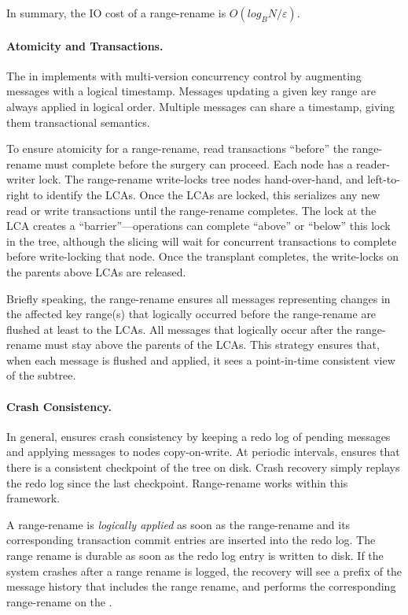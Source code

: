 In summary, the IO cost of a range-rename is $O(log_{B}{N}/\varepsilon)$.

\paragraph{Atomicity and Transactions.}
The \fti in \betrfs implements \bets with multi-version concurrency control by
augmenting messages with a logical timestamp.
Messages updating a given key range are always applied in logical order.
Multiple messages can share a timestamp, giving them transactional semantics.

To ensure atomicity for a range-rename,
read transactions ``before'' the range-rename must complete before the surgery
can proceed.
Each \bet node has a reader-writer lock.
The range-rename write-locks tree nodes hand-over-hand, and left-to-right to
identify the LCAs.
Once the LCAs are locked, this serializes any new read or write transactions
until the range-rename completes.
The lock at the LCA creates a ``barrier''---operations can complete ``above'' or
``below'' this lock in the tree, although the slicing will wait for concurrent
transactions to complete before write-locking that node.
Once the transplant completes, the write-locks on the parents above LCAs are
released.

Briefly speaking, the range-rename ensures all messages representing changes in
the affected key range(s) that logically occurred before the range-rename are
flushed at least to the LCAs.
All messages that logically occur after the range-rename must stay above the
parents of the LCAs.
This strategy ensures that, when each message is flushed and applied, it sees a
point-in-time consistent view of the subtree.

\paragraph{Crash Consistency.}
In general, \fti ensures crash consistency by keeping a redo log of pending
messages and applying messages to nodes copy-on-write.
At periodic intervals, \fti ensures that there is a consistent checkpoint
of the tree on disk.
Crash recovery simply replays the redo log since the last checkpoint.
Range-rename works within this framework.

A range-rename is {\em logically applied} as soon as the
range-rename and its corresponding transaction commit entries are inserted into
the redo log.
The range rename is durable as soon as the redo log entry is written to disk.
If the system crashes after a range rename is logged, the recovery will see a
prefix of the message history that includes the range rename,
and performs the corresponding range-rename on the \bet.

